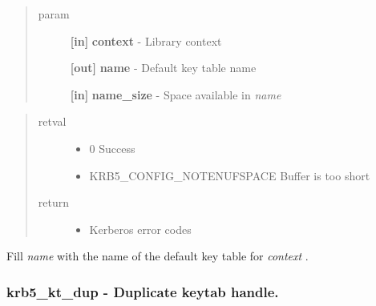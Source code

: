 \documentclass[letterpaper,10pt,english]{sphinxmanual}
\begin{document}
\begin{fulllineitems}
\label{appdev/refs/api/krb5_kt_default_name:c.krb5_kt_default_name}
\end{fulllineitems}

\begin{quote}\begin{description}
\item[{param}] \leavevmode
\textbf{{[}in{]}} \textbf{context} - Library context

\textbf{{[}out{]}} \textbf{name} - Default key table name

\textbf{{[}in{]}} \textbf{name\_size} - Space available in \emph{name}

\end{description}\end{quote}
\begin{quote}\begin{description}
\item[{retval}] \leavevmode\begin{itemize}
\item {} 
0   Success

\item {} 
KRB5\_CONFIG\_NOTENUFSPACE   Buffer is too short

\end{itemize}

\item[{return}] \leavevmode\begin{itemize}
\item {} 
Kerberos error codes

\end{itemize}

\end{description}\end{quote}

Fill \emph{name} with the name of the default key table for \emph{context} .


\subsubsection{krb5\_kt\_dup -  Duplicate keytab handle.}
\label{appdev/refs/api/krb5_kt_dup:krb5-kt-dup-duplicate-keytab-handle}\label{appdev/refs/api/krb5_kt_dup::doc}
\end{document}
